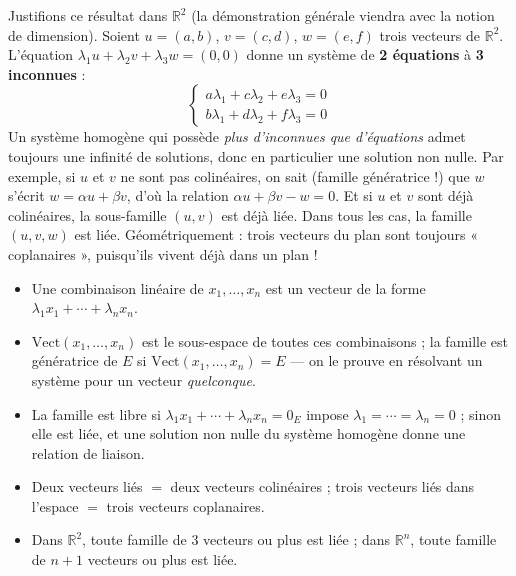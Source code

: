 \documentclass[11pt]{article}
\newcommand{\cle}[1]{{\popxbold\color{popdark}#1}}
\begin{document}
\begin{experience}
Justifions ce résultat dans $\mathbb{R}^2$ (la démonstration générale viendra avec la notion de dimension). Soient $u = (a, b)$, $v = (c, d)$, $w = (e, f)$ trois vecteurs de $\mathbb{R}^2$. L'équation $\lambda_1 u + \lambda_2 v + \lambda_3 w = (0,0)$ donne un système de \textbf{2 équations} à \textbf{3 inconnues} :
\[ \begin{cases} a\lambda_1 + c\lambda_2 + e\lambda_3 = 0 \\ b\lambda_1 + d\lambda_2 + f\lambda_3 = 0 \end{cases} \]
Un système homogène qui possède \emph{plus d'inconnues que d'équations} admet toujours une infinité de solutions, donc en particulier une solution non nulle. Par exemple, si $u$ et $v$ ne sont pas colinéaires, on sait (famille génératrice !) que $w$ s'écrit $w = \alpha u + \beta v$, d'où la relation $\alpha u + \beta v - w = 0$. Et si $u$ et $v$ sont déjà colinéaires, la sous-famille $(u, v)$ est déjà liée. Dans tous les cas, la famille $(u, v, w)$ est liée. Géométriquement : trois vecteurs du plan sont toujours « coplanaires », puisqu'ils vivent déjà dans un plan !
\end{experience}

\begin{aretenir}
\begin{itemize}
\item Une \cle{combinaison linéaire} de $x_1, \ldots, x_n$ est un vecteur de la forme $\lambda_1 x_1 + \cdots + \lambda_n x_n$.
\item $\mathrm{Vect}(x_1, \ldots, x_n)$ est le sous-espace de toutes ces combinaisons ; la famille est \cle{génératrice} de $E$ si $\mathrm{Vect}(x_1, \ldots, x_n) = E$ — on le prouve en résolvant un système pour un vecteur \emph{quelconque}.
\item La famille est \cle{libre} si $\lambda_1 x_1 + \cdots + \lambda_n x_n = 0_E$ impose $\lambda_1 = \cdots = \lambda_n = 0$ ; sinon elle est \cle{liée}, et une solution non nulle du système homogène donne une relation de liaison.
\item Deux vecteurs liés $=$ deux vecteurs colinéaires ; trois vecteurs liés dans l'espace $=$ trois vecteurs coplanaires.
\item Dans $\mathbb{R}^2$, toute famille de $3$ vecteurs ou plus est liée ; dans $\mathbb{R}^n$, toute famille de $n+1$ vecteurs ou plus est liée.
\end{itemize}
\end{aretenir}
\end{document}
